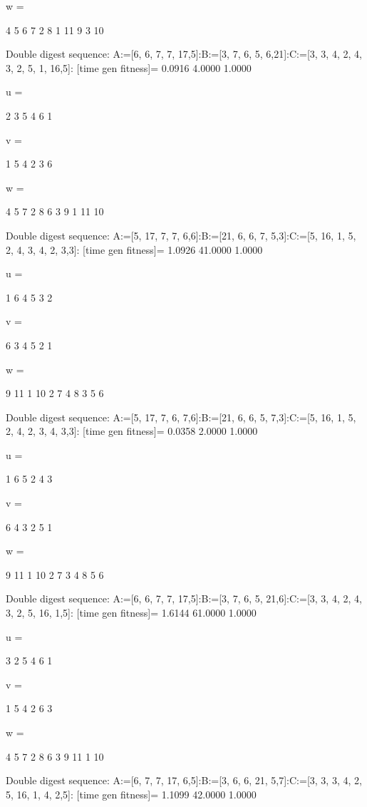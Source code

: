 w =

     4     5     6     7     2     8     1    11     9     3    10

Double digest sequence:
A:=[6, 6, 7, 7, 17,5]:B:=[3, 7, 6, 5, 6,21]:C:=[3, 3, 4, 2, 4, 3, 2, 5, 1, 16,5]:
[time gen fitness]=
    0.0916    4.0000    1.0000


u =

     2     3     5     4     6     1


v =

     1     5     4     2     3     6


w =

     4     5     7     2     8     6     3     9     1    11    10

Double digest sequence:
A:=[5, 17, 7, 7, 6,6]:B:=[21, 6, 6, 7, 5,3]:C:=[5, 16, 1, 5, 2, 4, 3, 4, 2, 3,3]:
[time gen fitness]=
    1.0926   41.0000    1.0000


u =

     1     6     4     5     3     2


v =

     6     3     4     5     2     1


w =

     9    11     1    10     2     7     4     8     3     5     6

Double digest sequence:
A:=[5, 17, 7, 6, 7,6]:B:=[21, 6, 6, 5, 7,3]:C:=[5, 16, 1, 5, 2, 4, 2, 3, 4, 3,3]:
[time gen fitness]=
    0.0358    2.0000    1.0000


u =

     1     6     5     2     4     3


v =

     6     4     3     2     5     1


w =

     9    11     1    10     2     7     3     4     8     5     6

Double digest sequence:
A:=[6, 6, 7, 7, 17,5]:B:=[3, 7, 6, 5, 21,6]:C:=[3, 3, 4, 2, 4, 3, 2, 5, 16, 1,5]:
[time gen fitness]=
    1.6144   61.0000    1.0000


u =

     3     2     5     4     6     1


v =

     1     5     4     2     6     3


w =

     4     5     7     2     8     6     3     9    11     1    10

Double digest sequence:
A:=[6, 7, 7, 17, 6,5]:B:=[3, 6, 6, 21, 5,7]:C:=[3, 3, 3, 4, 2, 5, 16, 1, 4, 2,5]:
[time gen fitness]=
    1.1099   42.0000    1.0000


